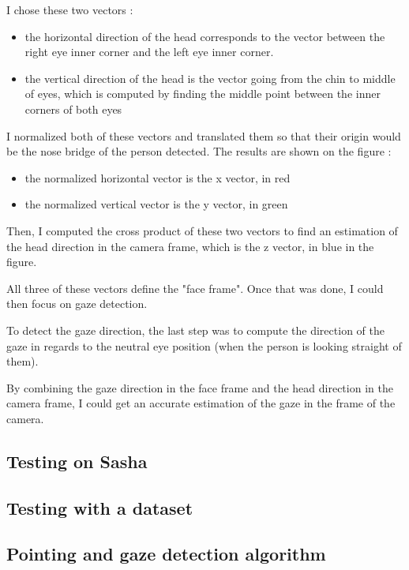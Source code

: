 I chose these two vectors :
\begin{itemize}
    \item the horizontal direction of the head corresponds to the vector between the right eye inner corner and the left eye inner corner.
    \item the vertical direction of the head is the vector going from the chin to middle of eyes, which is computed by finding the middle point between the inner corners of both eyes
\end{itemize}


I normalized both of these vectors and translated them so that their origin would be the nose bridge of the person detected. The results are shown on the figure :
\begin{itemize}
    \item the normalized horizontal vector is the x vector, in red
    \item the normalized vertical vector is the y vector, in green
\end{itemize}


Then, I computed the cross product of these two vectors to find an estimation of the head direction in the camera frame, which is the z vector, in blue in the figure.

All three of these vectors define the "face frame". Once that was done, I could then focus on gaze detection.

To detect the gaze direction, the last step was to compute the direction of the gaze in regards to the neutral eye position (when the person is looking straight of them).

By combining the gaze direction in the face frame and the head direction in the camera frame, I could get an accurate estimation of the gaze in the frame of the camera.






\subsection{Testing on Sasha}

\subsection{Testing with a dataset}

\subsection{Pointing and gaze detection algorithm}
\newpage
